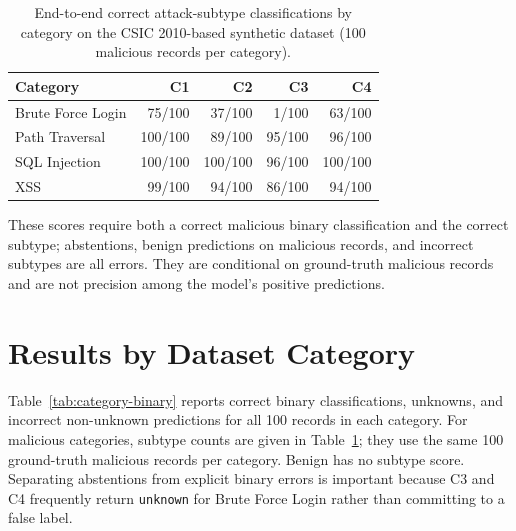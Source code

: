 \begin{table}[htbp]
\centering
\caption{End-to-end correct attack-subtype classifications by category on the CSIC 2010-based synthetic dataset (100 malicious records per category).}
\label{tab:subtype-by-category}
\begin{tabular}{@{}lrrrr@{}}
\toprule
Category & C1 & C2 & C3 & C4 \\
\midrule
Brute Force Login & 75/100 & 37/100 & 1/100 & 63/100 \\
Path Traversal & 100/100 & 89/100 & 95/100 & 96/100 \\
SQL Injection & 100/100 & 100/100 & 96/100 & 100/100 \\
XSS & 99/100 & 94/100 & 86/100 & 94/100 \\
\bottomrule
\end{tabular}
\end{table}

These scores require both a correct malicious binary classification and
the correct subtype; abstentions, benign predictions on malicious
records, and incorrect subtypes are all errors. They are conditional on
ground-truth malicious records and are not precision among the model's
positive predictions.

\section{Results by Dataset Category}\label{per-attack-analysis}

Table~\ref{tab:category-binary} reports correct binary classifications,
unknowns, and incorrect non-unknown predictions for all 100 records in
each category. For malicious categories, subtype counts are given in
Table~\ref{tab:subtype-by-category}; they use the same 100
ground-truth malicious records per category. Benign has no subtype
score. Separating abstentions from explicit binary errors is important
because C3 and C4 frequently return \texttt{unknown} for Brute Force
Login rather than committing to a false label.

